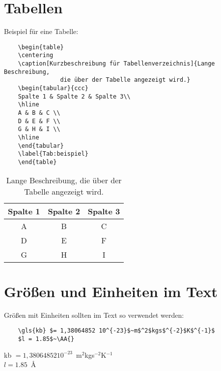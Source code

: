 \pagebreak %

\section{Tabellen}
Beispiel für eine Tabelle:
\begin{verbatim}
	\begin{table}
	\centering
	\caption[Kurzbeschreibung für Tabellenverzeichnis]{Lange Beschreibung,
				die über der Tabelle angezeigt wird.}
	\begin{tabular}{ccc}
	Spalte 1 & Spalte 2 & Spalte 3\\
	\hline 
	A & B & C \\
	D & E & F \\
	G & H & I \\
	\hline 
	\end{tabular}
	\label{Tab:beispiel}
	\end{table}
\end{verbatim}

\begin{table}
\centering
\caption[Kurzbeschreibung für Tabellenverzeichnis]{Lange Beschreibung, die über der Tabelle angezeigt wird.}
\begin{tabular}{ccc}
Spalte 1 & Spalte 2 & Spalte 3\\
\hline 
A & B & C \\
D & E & F \\
G & H & I \\
\hline 
\end{tabular}
\label{Tab:beispiel}
\end{table}

\section{Größen und Einheiten im Text}
Größen mit Einheiten sollten im Text so verwendet werden:
\begin{verbatim}
	\gls{kb} $= 1,38064852 10^{-23}$~m$^2$kgs$^{-2}$K$^{-1}$
	$l = 1.85$~\AA{}
\end{verbatim}
\gls{kb} $= 1,38064852 10^{-23}$~m$^2$kgs$^{-2}$K$^{-1}$\\
$l = 1.85$~\AA{}